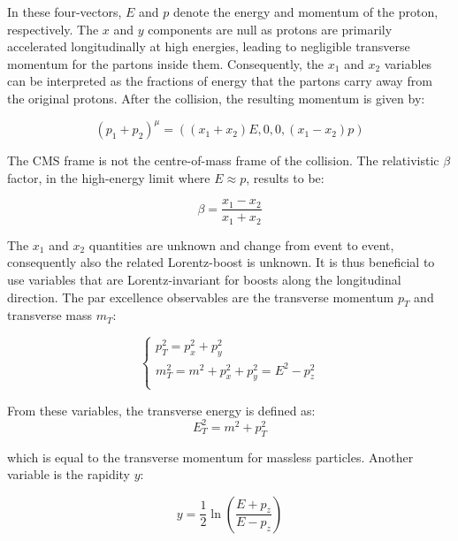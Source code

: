 \documentclass[11pt]{article}
\begin{document}
In these four-vectors, \(E\) and \(p\) denote the energy and momentum of the proton, respectively.
The \(x\) and \(y\) components are null as protons are primarily accelerated longitudinally at high energies, leading to negligible transverse momentum for the partons inside them.
Consequently, the \(x_1\) and \(x_2\) variables can be interpreted as the fractions of energy that the partons carry away from the original protons.
After the collision, the resulting momentum is given by:

\begin{equation}
\label{eq:pmomenta}
(p_1 + p_2)^{\mu} = ((x_1 + x_2)E, 0, 0, (x_1 - x_2)p)
\end{equation}

The CMS frame is not the centre-of-mass frame of the collision.
The relativistic \(\beta\) factor, in the high-energy limit where \(E \approx p\), results to be:

\begin{equation}
\label{eq:beta}
\beta = \frac{x_1 - x_2}{x_1 + x_2}
\end{equation}

The \(x_1\) and \(x_2\) quantities are unknown and change from event to event, consequently also the related Lorentz-boost is unknown.
It is thus beneficial to use variables that are Lorentz-invariant for boosts along the longitudinal direction.
The par excellence observables are the transverse momentum \(p_T\) and transverse mass \(m_T\):

\begin{equation}
\label{eq:transverse_momenta}
\begin{cases}
p^2_T = p^2_x + p^2_y \\
m^2_T = m^2 + p^2_x + p^2_y = E^2 - p^2_z \\
\end{cases}
\end{equation}


From these variables, the transverse energy is defined as:
\begin{equation}
\label{eq:transverse energy}
E^2_T = m^2 + p^2_T
\end{equation}

which is equal to the transverse momentum for massless particles.
Another variable is the rapidity \(y\):

\begin{equation}
\label{eq:rapidity}
y = \frac{1}{2} \ln \left( \frac{E + p_z}{E - p_z} \right)
\end{equation}
\end{document}
